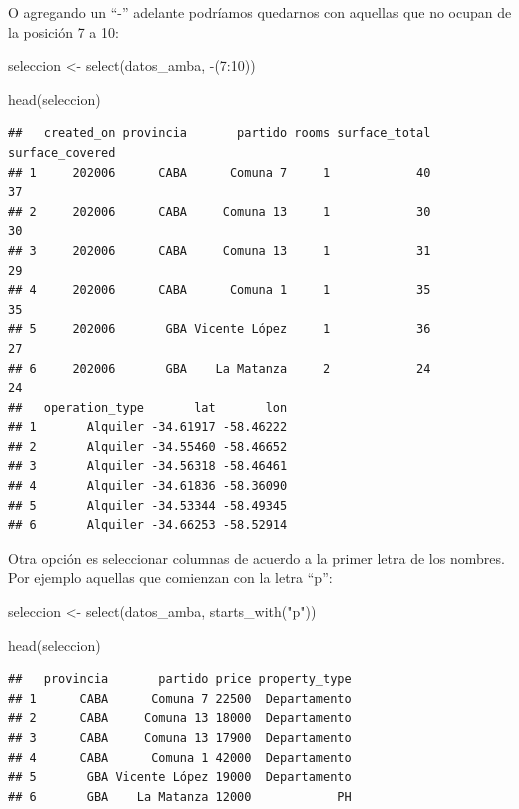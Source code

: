 \documentclass[
  spanish,
]{book}
\newenvironment{Shaded}{\begin{snugshade}}{\end{snugshade}}
\newcommand{\DecValTok}[1]{\textcolor[rgb]{0.00,0.00,0.81}{#1}}
\newcommand{\FunctionTok}[1]{\textcolor[rgb]{0.00,0.00,0.00}{#1}}
\newcommand{\NormalTok}[1]{#1}
\newcommand{\OtherTok}[1]{\textcolor[rgb]{0.56,0.35,0.01}{#1}}
\newcommand{\SpecialCharTok}[1]{\textcolor[rgb]{0.00,0.00,0.00}{#1}}
\newcommand{\StringTok}[1]{\textcolor[rgb]{0.31,0.60,0.02}{#1}}
\begin{document}
O agregando un ``-'' adelante podríamos quedarnos con aquellas que no ocupan de la posición 7 a 10:

\begin{Shaded}
\begin{Highlighting}[]
\NormalTok{seleccion }\OtherTok{\textless{}{-}} \FunctionTok{select}\NormalTok{(datos\_amba, }\SpecialCharTok{{-}}\NormalTok{(}\DecValTok{7}\SpecialCharTok{:}\DecValTok{10}\NormalTok{))}

\FunctionTok{head}\NormalTok{(seleccion)}
\end{Highlighting}
\end{Shaded}

\begin{verbatim}
##   created_on provincia       partido rooms surface_total surface_covered
## 1     202006      CABA      Comuna 7     1            40              37
## 2     202006      CABA     Comuna 13     1            30              30
## 3     202006      CABA     Comuna 13     1            31              29
## 4     202006      CABA      Comuna 1     1            35              35
## 5     202006       GBA Vicente López     1            36              27
## 6     202006       GBA    La Matanza     2            24              24
##   operation_type       lat       lon
## 1       Alquiler -34.61917 -58.46222
## 2       Alquiler -34.55460 -58.46652
## 3       Alquiler -34.56318 -58.46461
## 4       Alquiler -34.61836 -58.36090
## 5       Alquiler -34.53344 -58.49345
## 6       Alquiler -34.66253 -58.52914
\end{verbatim}

Otra opción es seleccionar columnas de acuerdo a la primer letra de los nombres. Por ejemplo aquellas que comienzan con la letra ``p'':

\begin{Shaded}
\begin{Highlighting}[]
\NormalTok{seleccion }\OtherTok{\textless{}{-}} \FunctionTok{select}\NormalTok{(datos\_amba, }\FunctionTok{starts\_with}\NormalTok{(}\StringTok{"p"}\NormalTok{))}

\FunctionTok{head}\NormalTok{(seleccion)}
\end{Highlighting}
\end{Shaded}

\begin{verbatim}
##   provincia       partido price property_type
## 1      CABA      Comuna 7 22500  Departamento
## 2      CABA     Comuna 13 18000  Departamento
## 3      CABA     Comuna 13 17900  Departamento
## 4      CABA      Comuna 1 42000  Departamento
## 5       GBA Vicente López 19000  Departamento
## 6       GBA    La Matanza 12000            PH
\end{verbatim}
\end{document}
